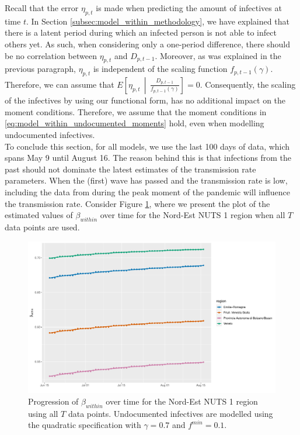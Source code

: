 \documentclass[12pt]{article}
\begin{document}
	Recall that the error $\eta_{p,t}$ is made when predicting the amount of infectives at time $t$. In Section \ref{subsec:model_within_methodology}, we have explained that there is a latent period during which an infected person is not able to infect others yet. As such, when considering only a one-period difference, there should be no correlation between $\eta_{p,t}$ and $D_{p,t-1}$. Moreover, as was explained in the previous paragraph, $\eta_{p,t}$ is independent of the scaling function $f_{p,t-1}(\gamma)$. Therefore, we can assume that $E\left[\eta_{p,t} \,\middle|\, \frac{D_{p,t-1}}{f_{p,t-1}(\gamma)}\right] = 0$. Consequently, the scaling of the infectives by using our functional form, has no additional impact on the moment conditions. Therefore, we assume that the moment conditions in \eqref{eq:model_within_undocumented_moments} hold, even when modelling undocumented infectives. \\
	
	To conclude this section, for all models, we use the last 100 days of data, which spans May 9 until August 16. The reason behind this is that infections from the past should not dominate the latest estimates of the transmission rate parameters. When the (first) wave has passed and the transmission rate is low, including the data from during the peak moment of the pandemic will influence the transmission rate. Consider Figure \ref{fig:beta_within_over_time_nordest_not_rolling}, where we present the plot of the estimated values of $\beta_{within}$ over time for the Nord-Est NUTS 1 region when all $T$ data points are used.
	
	\begin{figure}[H]
	    \centering
        \includegraphics[width=0.92\linewidth]{output/model_within_lag14_betawithin_Nord-Est_UndocQuadratic.pdf}
	    \caption{Progression of $\beta_{within}$ over time for the Nord-Est NUTS 1 region using all $T$ data points. Undocumented infectives are modelled using the quadratic specification with $\gamma = 0.7$ and $f^{min}=0.1$.}
	    \label{fig:beta_within_over_time_nordest_not_rolling}
    \end{figure}
	
\end{document}
